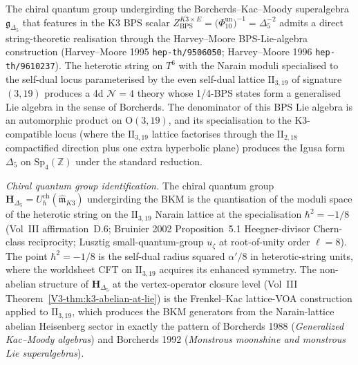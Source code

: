 \begin{remark}
\label{rem:3dg-witten-heterotic-t6-narain-3-19}
%
%
%
%
%
The chiral quantum group undergirding the Borcherds--Kac--Moody
superalgebra \(\mathfrak{g}_{\Delta_{5}}\) that features in the K3
BPS scalar \(Z_{\mathrm{BPS}}^{K3\times E}
=\bigl(\Phi_{10}^{\mathrm{un}}\bigr)^{-1}=\Delta_{5}^{-2}\) admits a direct
string-theoretic realisation through the
Harvey--Moore BPS-Lie-algebra construction
(Harvey--Moore 1995 \texttt{hep-th/9506050}; Harvey--Moore 1996
\texttt{hep-th/9610237}). The heterotic string on $T^{6}$ with the
Narain moduli specialised to the self-dual locus parameterised by
the even self-dual lattice $\mathrm{II}_{3,19}$ of signature
$(3,19)$ produces a 4d $\mathcal{N} = 4$ theory whose 1/4-BPS
states form a generalised Lie algebra in the sense of Borcherds. The
denominator of this BPS Lie algebra is an automorphic product on
$\mathrm{O}(3, 19)$, and its specialisation to the K3-compatible
locus (where the $\mathrm{II}_{3,19}$ lattice factorises through the
$\mathrm{II}_{2,18}$ compactified direction plus one extra hyperbolic
plane) produces the Igusa form $\Delta_{5}$ on
$\mathrm{Sp}_{4}(\mathbb{Z})$ under the standard reduction.

\emph{Chiral quantum group identification.} The chiral quantum
group $\mathbf{H}_{\Delta_{5}} = U_{\hbar}^{\mathrm{ch}}(\widehat{\mathfrak{m}}_{K3})$
undergirding the BKM is the quantisation of the moduli space of the
heterotic string on the $\mathrm{II}_{3,19}$ Narain lattice at the
specialisation $\hbar^{2} = -1/8$ (Vol~III affirmation~D.6;
Bruinier 2002 Proposition~5.1 Heegner-divisor Chern-class reciprocity;
Lusztig small-quantum-group $u_{\zeta}$ at root-of-unity order $\ell = 8$).
The point $\hbar^{2} = -1/8$ is the self-dual radius squared
$\alpha'/8$ in heterotic-string units, where the worldsheet CFT on
$\mathrm{II}_{3,19}$ acquires its enhanced symmetry. The non-abelian
structure of $\mathbf{H}_{\Delta_{5}}$ at the vertex-operator closure
level (Vol~III Theorem~\ref*{V3-thm:k3-abelian-at-lie}) is the
Frenkel--Kac lattice-VOA construction applied to $\mathrm{II}_{3,19}$,
which produces the BKM generators from the Narain-lattice abelian
Heisenberg sector in exactly the pattern of Borcherds 1988
(\emph{Generalized Kac--Moody algebras}) and Borcherds 1992
(\emph{Monstrous moonshine and monstrous Lie superalgebras}).


\end{remark}
